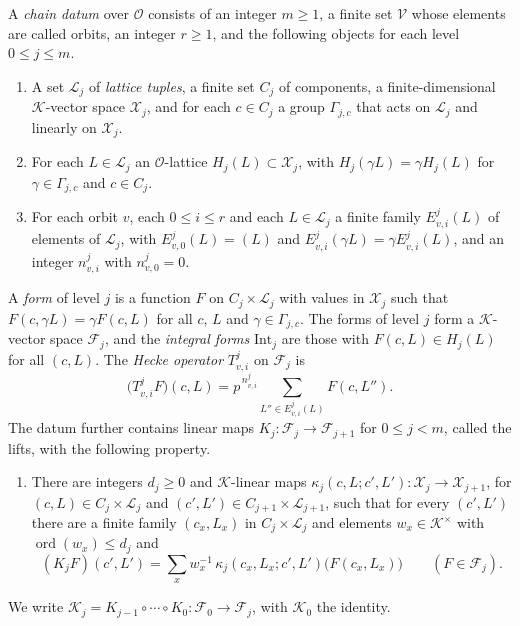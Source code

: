 \begin{definition}\label{chaindatum}
A \emph{chain datum} over $\mathcal O$ consists of an integer $m\ge1$, a finite set $\mathcal V$ whose elements are called orbits, an integer $r\ge1$, and the following objects for each level $0\le j\le m$.
\begin{enumerate}
\item[(a)] A set $\mathcal L_j$ of \emph{lattice tuples}, a finite set $C_j$ of components, a finite-dimensional $\mathcal K$-vector space $\mathcal X_j$, and for each $c\in C_j$ a group $\Gamma_{j,c}$ that acts on $\mathcal L_j$ and linearly on $\mathcal X_j$.
\item[(b)] For each $L\in\mathcal L_j$ an $\mathcal O$-lattice $H_j(L)\subset\mathcal X_j$, with $H_j(\gamma L)=\gamma H_j(L)$ for $\gamma\in\Gamma_{j,c}$ and $c\in C_j$.
\item[(c)] For each orbit $v$, each $0\le i\le r$ and each $L\in\mathcal L_j$ a finite family $E^j_{v,i}(L)$ of elements of $\mathcal L_j$, with $E^j_{v,0}(L)=(L)$ and $E^j_{v,i}(\gamma L)=\gamma E^j_{v,i}(L)$, and an integer $n^j_{v,i}$ with $n^j_{v,0}=0$.
\end{enumerate}
A \emph{form} of level $j$ is a function $F$ on $C_j\times\mathcal L_j$ with values in $\mathcal X_j$ such that $F(c,\gamma L)=\gamma F(c,L)$ for all $c$, $L$ and $\gamma\in\Gamma_{j,c}$. The forms of level $j$ form a $\mathcal K$-vector space $\mathcal F_j$, and the \emph{integral forms} $\mathrm{Int}_j$ are those with $F(c,L)\in H_j(L)$ for all $(c,L)$. The \emph{Hecke operator} $T^j_{v,i}$ on $\mathcal F_j$ is
\[
\big(T^j_{v,i}F\big)(c,L)=p^{\,n^j_{v,i}}\sum_{L''\in E^j_{v,i}(L)}F(c,L'') .
\]
The datum further contains linear maps $K_j\colon\mathcal F_j\to\mathcal F_{j+1}$ for $0\le j<m$, called the lifts, with the following property.
\begin{enumerate}
\item[(D1)] There are integers $d_j\ge0$ and $\mathcal K$-linear maps $\kappa_j(c,L;c',L')\colon\mathcal X_j\to\mathcal X_{j+1}$, for $(c,L)\in C_j\times\mathcal L_j$ and $(c',L')\in C_{j+1}\times\mathcal L_{j+1}$, such that for every $(c',L')$ there are a finite family $(c_x,L_x)$ in $C_j\times\mathcal L_j$ and elements $w_x\in\mathcal K^\times$ with $\operatorname{ord}(w_x)\le d_j$ and
\[
(K_jF)(c',L')=\sum_xw_x^{-1}\,\kappa_j(c_x,L_x;c',L')\big(F(c_x,L_x)\big)\qquad(F\in\mathcal F_j).
\]
\end{enumerate}
We write $\mathcal K_j=K_{j-1}\circ\cdots\circ K_0\colon\mathcal F_0\to\mathcal F_j$, with $\mathcal K_0$ the identity.
\end{definition}

